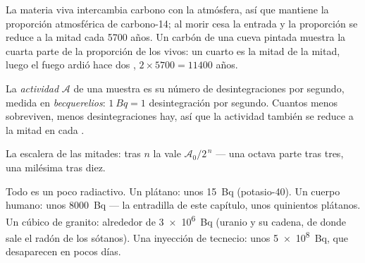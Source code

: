 \begin{example}\label{ex:g11:nucleus-radioactivity:dating}
La materia viva intercambia carbono con la atmósfera, así que mantiene
la proporción atmosférica de carbono-14; al morir cesa la entrada y la
proporción se reduce a la mitad cada \num{5700} años. Un carbón de una
cueva pintada muestra la cuarta parte de la proporción de los vivos: un
cuarto es la mitad de la mitad, luego el fuego ardió hace dos ,
$2 \times \num{5700} = \num{11400}$ años.
\end{example}

\begin{definition}[Actividad]\label{def:g11:nucleus-radioactivity:activity}
La \emph{actividad} $\mathcal A$ de una muestra es su
número de desintegraciones por segundo, medida en
\emph{becquerelios}: $\qty{1}{Bq} = 1$
desintegración por segundo. Cuantos menos  sobreviven, menos
desintegraciones hay, así que la actividad también se reduce a la mitad
en cada .
\end{definition}

\begin{omfigure}

{\small La escalera de las mitades: tras $n$  la  vale
$\mathcal A_0/2^{\,n}$ --- una octava parte tras tres, una milésima tras
diez.}
\end{omfigure}

\begin{example}\label{ex:g11:nucleus-radioactivity:orders}
Todo es un poco radiactivo. Un plátano: unos \qty{15}{Bq}
(potasio-40). Un cuerpo humano: unos \qty{8000}{Bq} --- la entradilla de
este capítulo, unos quinientos plátanos. Un  cúbico de granito:
alrededor de \qty{3e6}{Bq} (uranio y su cadena, de donde sale el radón
de los sótanos). Una inyección de tecnecio: unos \qty{5e8}{Bq}, que
desaparecen en pocos días.
\end{example}


